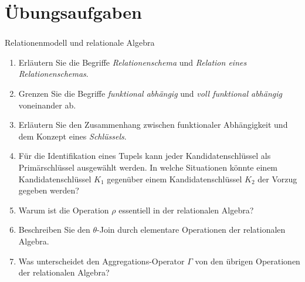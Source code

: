 \section*{Übungsaufgaben}
\begin{frame}[t]
	\frametitle{\insertsection}	
	\begin{alertblock}{Relationenmodell und relationale Algebra}
		\begin{enumerate}
			\item Erläutern Sie die Begriffe \emph{Relationenschema} und \emph{Relation eines Relationenschemas}.
			\item Grenzen Sie die Begriffe \textit{funktional abhängig} und \textit{voll funktional abhängig} voneinander ab.
			\item Erläutern Sie den Zusammenhang zwischen funktionaler Abhängigkeit und dem Konzept eines \textit{Schlüssels}.
			\item Für die Identifikation eines Tupels kann jeder Kandidatenschlüssel als Primärschlüssel ausgewählt werden. 
			In welche Situationen könnte einem Kandidatenschlüssel $K_1$ gegenüber einem Kandidatenschlüssel $K_2$ der Vorzug gegeben werden?
			\item Warum ist die Operation $\rho$ essentiell in der relationalen Algebra?
			\item Beschreiben Sie den $\theta$-Join durch elementare Operationen der relationalen Algebra.
			\item Was unterscheidet den Aggregations-Operator $\Gamma$ von den übrigen Operationen der relationalen Algebra?
		\end{enumerate}
	\end{alertblock}
\end{frame}
